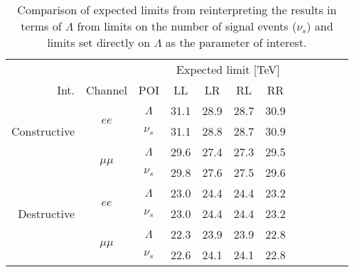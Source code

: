 \begin{table}[htp]
    \begin{center}  
{\begin{tabular}{r c c c c c c c c c c c}\toprule
    & & & \multicolumn{4}{c}{Expected limit [TeV]} \\
    Int. & Channel & POI & LL & LR & RL & RR \\
    \midrule
    \multirow{3}{*}[-1em]{\begin{sideways}Constructive\end{sideways}} & \multirow{2}{*}{$ee$} & $\Lambda$ & 31.1 & 28.9 & 28.7 & 30.9 \\
    & & $\nu_s$ & 31.1 & 28.8 & 28.7 & 30.9 \\
    \cmidrule{2-7}
     & \multirow{2}{*}{$\mu\mu$} & $\Lambda$ & 29.6 & 27.4 & 27.3 & 29.5 \\
    & & $\nu_s$ & 29.8 & 27.6 & 27.5 & 29.6 \\
    \midrule
    \multirow{3}{*}[-1em]{\begin{sideways}Destructive\end{sideways}} & \multirow{2}{*}{$ee$} & $\Lambda$ & 23.0 & 24.4 & 24.4 & 23.2 \\
    & & $\nu_s$ & 23.0 & 24.4 & 24.4 & 23.2 \\
    \cmidrule{2-7}
     & \multirow{2}{*}{$\mu\mu$} & $\Lambda$ & 22.3 & 23.9 & 23.9 & 22.8 \\
    & & $\nu_s$ & 22.6 & 24.1 & 24.1 & 22.8 \\
\bottomrule\end{tabular}}
\caption{Comparison of expected limits from reinterpreting the results in terms of $\Lambda$ from limits on the number of signal events ($\nu_s$) and limits set directly on $\Lambda$ as the parameter of interest.}  
\label{tab:limits_comparePOI}
\end{center}
\end{table}

\clearpage
